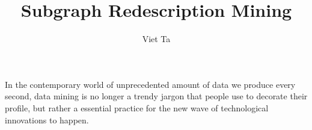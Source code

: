 \documentclass[12pt,a4paper,draft]{article}
\author{Viet Ta}
\title{Subgraph Redescription Mining}
\begin{document}
\maketitle
In the contemporary world of unprecedented amount of data we produce every second, data mining is no longer a trendy jargon that people use to decorate their profile, but rather a essential practice for the new wave of technological innovations to happen.
\end{document}
